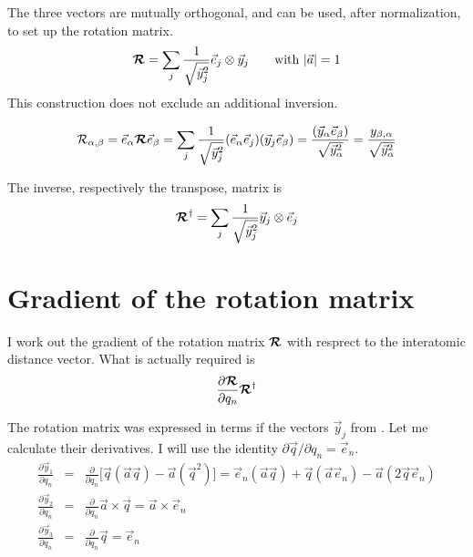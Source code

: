 \documentclass[11pt,a4paper]{report}
\begin{document}
The three vectors are mutually orthogonal, and can be used, after
normalization, to set up the rotation matrix.
\begin{eqnarray}
\bm{\mathcal{R}}=\sum_j \frac{1}{\sqrt{\vec{y}_j^2}}\vec{e}_j\otimes\vec{y}_j
\qquad\text{with $|\vec{a}|=1$}
\end{eqnarray}
This construction does not exclude an additional inversion.

\begin{eqnarray}
\mathcal{R}_{\alpha,\beta}=\vec{e}_\alpha\bm{\mathcal{R}}\vec{e}_\beta
=\sum_j \frac{1}{\sqrt{\vec{y}_j^2}}
(\vec{e}_\alpha\vec{e}_j)(\vec{y}_j\vec{e}_\beta)
= \frac{(\vec{y}_\alpha\vec{e}_\beta)}{\sqrt{\vec{y}_\alpha^2}}
= \frac{y_{\beta,\alpha}}{\sqrt{\vec{y}_\alpha^2}}
\end{eqnarray}

The inverse, respectively the transpose, matrix is
\begin{eqnarray}
\bm{\mathcal{R}}^{\dagger}
=\sum_j \frac{1}{\sqrt{\vec{y}_j^2}}\vec{y}_j\otimes\vec{e}_j
\end{eqnarray}

\section{Gradient of the rotation matrix}
I work out the gradient of the rotation matrix $\bm{\mathcal{R}}$
with resprect to the interatomic distance vector. What is actually
required is
\begin{eqnarray}
\frac{\partial\bm{\mathcal{R}}}{\partial q_n}
\bm{\mathcal{R}}^\dagger
\end{eqnarray}

The rotation matrix was expressed in terms if the vectors $\vec{y}_j$
from . Let me calculate their derivatives.
I will use the identity $\partial\vec{q}/\partial{q}_n=\vec{e}_n$.
\begin{eqnarray}
\frac{\partial\vec{y}_1}{\partial{q}_n}
&=&
\frac{\partial}{\partial{q}_n}
\biggl[
\vec{q}(\vec{a}\vec{q})-\vec{a}(\vec{q}^2)
\biggr]
=\vec{e}_n(\vec{a}\vec{q})+\vec{q}(\vec{a}\vec{e}_n)
-\vec{a}(2\vec{q}\vec{e}_n)
\nonumber\\
%
%
\frac{\partial\vec{y}_2}{\partial{q}_n}
&=&\frac{\partial}{\partial{q}_n}\vec{a}\times\vec{q}
=\vec{a}\times\vec{e}_n
\nonumber\\
%
%
\frac{\partial\vec{y}_3}{\partial{q}_n}
&=&\frac{\partial}{\partial{q}_n}\vec{q}
=\vec{e}_n
\end{eqnarray}
\end{document}

